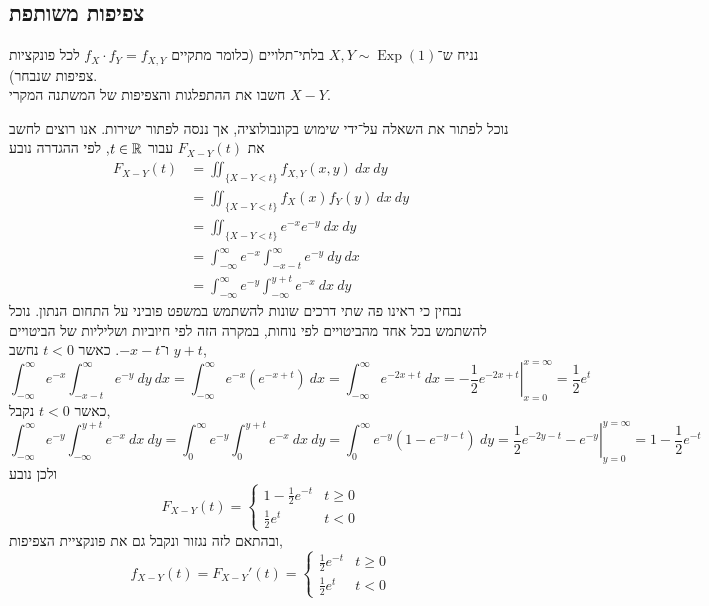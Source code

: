 \subsection{צפיפות משותפת}
\begin{exercise}
	נניח ש־$X, Y \sim \operatorname{Exp}(1)$ בלתי־תלויים (כלומר מתקיים $f_X \cdot f_Y = f_{X, Y}$ לכל פונקציות צפיפות שנבחר). \\
	חשבו את ההתפלגות והצפיפות של המשתנה המקרי $X - Y$.
\end{exercise}
\begin{solution}
	נוכל לפתור את השאלה על־ידי שימוש בקונבולוציה, אך ננסה לפתור ישירות.
	אנו רוצים לחשב את $F_{X - Y}(t)$ עבור $t \in \mathbb{R}$, לפי ההגדרה נובע
	\begin{align*}
		F_{X - Y}(t)
		& = \iint_{\{X - Y < t\}} f_{X, Y}(x, y)\ dx\ dy \\
		& = \iint_{\{X - Y < t\}} f_X(x) f_Y(y)\ dx\ dy \\
		& = \iint_{\{X - Y < t\}} e^{-x} e^{-y}\ dx\ dy \\
		& = \int_{-\infty}^{\infty} e^{-x} \int_{-x - t}^{\infty} e^{-y}\ dy\ dx \\
		& = \int_{-\infty}^{\infty} e^{-y} \int_{-\infty}^{y + t} e^{-x}\ dx\ dy
	\end{align*}
	נבחין כי ראינו פה שתי דרכים שונות להשתמש במשפט פוביני על התחום הנתון.
	נוכל להשתמש בכל אחד מהביטויים לפי נוחות, במקרה הזה לפי חיוביות ושליליות של הביטויים $y + t$ ו־$-x - t$.
	כאשר $t < 0$ נחשב,
	\[
		\int_{-\infty}^{\infty} e^{-x} \int_{-x - t}^{\infty} e^{-y}\ dy\ dx
		= \int_{-\infty}^{\infty} e^{-x} (e^{-x + t})\ dx
		= \int_{-\infty}^{\infty} e^{-2x + t}\ dx
		= \left. -\frac{1}{2} e^{-2x + t} \right\rvert_{x = 0}^{x = \infty}
		= \frac{1}{2} e^t
	\]
	כאשר $t < 0$ נקבל,
	\[
		\int_{-\infty}^{\infty} e^{-y} \int_{-\infty}^{y + t} e^{-x}\ dx\ dy
		= \int_{0}^{\infty} e^{-y} \int_{0}^{y + t} e^{-x}\ dx\ dy
		= \int_{0}^{\infty} e^{-y} (1 - e^{-y - t})\ dy
		= \left. \frac{1}{2} e^{-2y - t} - e^{-y} \right\rvert_{y = 0}^{y = \infty}
		= 1 - \frac{1}{2} e^{-t}
	\]
	ולכן נובע
	\[
		F_{X - Y}(t)
		= \begin{cases}
			1 - \frac{1}{2} e^{-t} & t \ge 0 \\
			\frac{1}{2} e^t & t < 0
		\end{cases}
	\]
	ובהתאם לזה נגזור ונקבל גם את פונקציית הצפיפות,
	\[
		f_{X - Y}(t)
		= F_{X - Y}'(t)
		= \begin{cases}
			\frac{1}{2} e^{-t} & t \ge 0 \\
			\frac{1}{2} e^t & t < 0
		\end{cases}
	\]
\end{solution}
